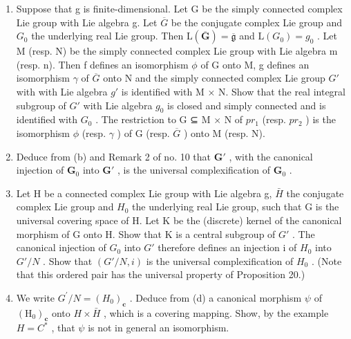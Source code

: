 \begin{enumerate}
\def\labelenumi{(\alph{enumi})}
\setcounter{enumi}{1}
\item
  Suppose that g is finite-dimensional. Let G be the simply connected complex Lie group with Lie algebra g. Let \(\overline{G}\) be the conjugate complex Lie group and \(G_{0}\) the underlying real Lie group. Then \(\mathrm{L}(\overline{\mathbf{G}})=\overline{\mathfrak{g}}\) and \(\mathrm{L}(G_{0})=g_{0}\) . Let M (resp. N) be the simply connected complex Lie group with Lie algebra m (resp. n). Then f defines an isomorphism \(\phi\) of G onto M, g defines an isomorphism \(\gamma\) of \(\overline{G}\) onto N and the simply connected complex Lie group \(G'\) with with Lie algebra \(g'\) is identified with M × N. Show that the real integral subgroup of \(G'\) with Lie algebra \(g_{0}\) is closed and simply connected and is identified with \(G_{0}\) . The restriction to G ⊆ M × N of \(pr_{1}\) (resp. \(pr_{2}\) ) is the isomorphism \(\phi\) (resp. \(\gamma\) ) of G (resp. \(\overline{G}\) ) onto M (resp. N).
\item
  Deduce from (b) and Remark 2 of no. 10 that \(\mathbf{G}'\) , with the canonical injection of \(\mathbf{G}_0\) into \(\mathbf{G}'\) , is the universal complexification of \(\mathbf{G}_0\) .
\item
  Let H be a connected complex Lie group with Lie algebra g, \(\bar{H}\) the conjugate complex Lie group and \(H_{0}\) the underlying real Lie group, such that G is the universal covering space of H. Let K be the (discrete) kernel of the canonical morphism of G onto H. Show that K is a central subgroup of \(G'\) . The canonical injection of \(G_{0}\) into \(G'\) therefore defines an injection i of \(H_{0}\) into \(G'/N\) . Show that \((G'/N, i)\) is the universal complexification of \(H_{0}\) . (Note that this ordered pair has the universal property of Proposition 20.)
\item
  We write \(G^{\prime}/N = (H_{0})_{\mathbf{c}}\) . Deduce from (d) a canonical morphism \(\psi\) of \((\mathrm{H}_{0})_{\mathbf{c}}\) onto \(H \times \bar{H}\) , which is a covering mapping. Show, by the example \(H = C^{*}\) , that \(\psi\) is not in general an isomorphism.
\end{enumerate}

